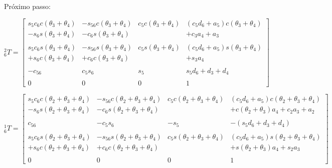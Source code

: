 Próximo passo:

\begin{equation}
    ^2_6T = \begin{bmatrix}
        s_5c_6c(\theta_3+\theta_4) & -s_{56}c(\theta_3+\theta_4) & c_5c(\theta_3+\theta_4) & (c_5d_6 + a_5)c(\theta_3+\theta_4) \\
        -s_6s(\theta_3+\theta_4) & -c_6s(\theta_3+\theta_4) & &  + c_3a_4 + a_3\\
        \\
        s_5c_6s(\theta_3+\theta_4) & -s_{56}s(\theta_3+\theta_4) & c_5s(\theta_3+\theta_4) & (c_5d_6 + a_5)s(\theta_3+\theta_4) \\
        +s_6c(\theta_3+\theta_4) & + c_6c(\theta_3+\theta_4) & & +s_3a_4 \\
        \\
        -c_{56} & c_5s_6 & s_5 & s_5d_6 + d_3 + d_4 \\
        \\
        0 & 0 & 0 & 1
    \end{bmatrix}
\end{equation}

\begin{equation}
    ^1_6T = \begin{bmatrix}
        s_5c_6c(\theta_2+\theta_3+\theta_4) & -s_{56}c(\theta_2+\theta_3+\theta_4) & c_5c(\theta_2+\theta_3+\theta_4) & (c_5d_6 + a_5)c(\theta_2+\theta_3+\theta_4) \\
        -s_6s(\theta_2+\theta_3+\theta_4) & -c_6s(\theta_2+\theta_3+\theta_4) & &  + c(\theta_2+\theta_3)a_4 + c_2a_3 + a_2\\
        \\
        c_{56} & -c_5s_6 & -s_5 & -(s_5d_6 + d_3 + d_4) \\
        \\
        s_5c_6s(\theta_2+\theta_3+\theta_4) & -s_{56}s(\theta_2+\theta_3+\theta_4) & c_5s(\theta_2+\theta_3+\theta_4) & (c_5d_6 + a_5)s(\theta_2+\theta_3+\theta_4) \\
        +s_6c(\theta_2+\theta_3+\theta_4) & + c_6c(\theta_2+\theta_3+\theta_4) & & +s(\theta_2+\theta_3)a_4 + s_2a_3 \\
        \\
        0 & 0 & 0 & 1
    \end{bmatrix}
\end{equation}

